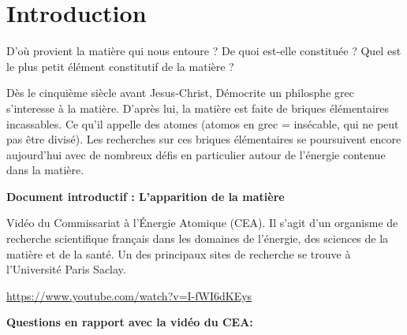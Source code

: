 \documentclass[french]{article}
\begin{document}
	

\clearpage
\section*{Introduction}

D'où provient la matière qui nous entoure ? De quoi est-elle constituée ? Quel est le plus petit élément constitutif de la matière ? \medskip

Dès le cinquième siècle avant Jesus-Christ, Démocrite un philosphe grec s'interesse à la matière. D'après lui, la matière est faite de briques élémentaires incassables. Ce qu'il appelle des atomes (atomos en grec = insécable, qui ne peut pas être divisé). Les recherches sur ces briques élémentaires se poursuivent encore aujourd'hui avec de nombreux défis en particulier autour de l'énergie contenue dans la matière.\medskip

\begin{mdframed}[style=doc, leftmargin=0pt, rightmargin=0pt, innertopmargin=8pt, innerbottommargin=8pt, innerrightmargin=10pt, innerleftmargin=10pt]
\textbf{Document introductif : L'apparition de la matière}

Vidéo du Commissariat à l'Énergie Atomique (CEA). Il s'agit d'un organisme de recherche scientifique français dans les domaines de l'énergie, des sciences de la matière et de la santé. Un des principaux sites de recherche se trouve à l'Université Paris Saclay. \medskip

\url{https://www.youtube.com/watch?v=I-fWI6dKEys}



\end{mdframed}

\noindent\textbf{Questions en rapport avec la vidéo du CEA: }
\end{document}
